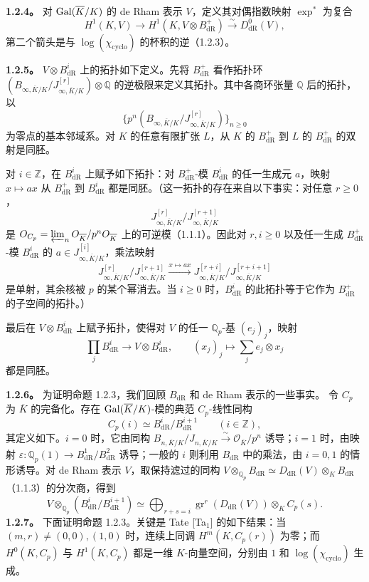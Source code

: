 \textbf{1.2.4。} 对 $\Gal(\overline K/K)$ 的 de Rham 表示 $V$，定义其对偶指数映射 $\exp^*$ 为复合
\[
 H^1(K,V)\longrightarrow H^1(K,V\otimes B^+_{\mathrm{dR}})\xrightarrow{\sim}D^0_{\mathrm{dR}}(V),
\]
第二个箭头是与 $\log(\chi_{\mathrm{cyclo}})$ 的杯积的逆（1.2.3）。

\textbf{1.2.5。} $V\otimes B^i_{\mathrm{dR}}$ 上的拓扑如下定义。先将 $B^+_{\mathrm{dR}}$ 看作拓扑环
$(B_{\infty,\overline K/K}/J^{[r]}_{\infty,\overline K/K})\otimes\mathbb Q$ 的逆极限来定义其拓扑。其中各商环张量 $\mathbb Q$ 后的拓扑，以
\[
 \{p^n(B_{\infty,\overline K/K}/J^{[r]}_{\infty,\overline K/K})\}_{n\ge0}
\]
为零点的基本邻域系。对 $K$ 的任意有限扩张 $L$，从 $K$ 的 $B^+_{\mathrm{dR}}$ 到 $L$ 的 $B^+_{\mathrm{dR}}$ 的双射是同胚。

对 $i\in\mathbb Z$，在 $B^i_{\mathrm{dR}}$ 上赋予如下拓扑：对 $B^+_{\mathrm{dR}}$-模 $B^i_{\mathrm{dR}}$ 的任一生成元 $a$，映射 $x\mapsto ax$ 从 $B^+_{\mathrm{dR}}$ 到 $B^i_{\mathrm{dR}}$ 都是同胚。（这一拓扑的存在来自以下事实：对任意 $r\ge0$，
\[
 J^{[r]}_{\infty,\overline K/K}/J^{[r+1]}_{\infty,\overline K/K}
\]
是 $\mathcal O_{C_p}=\varprojlim_n\mathcal O_{\overline K}/p^n\mathcal O_{\overline K}$ 上的可逆模（1.1.1）。因此对 $r,i\ge0$ 以及任一生成 $B^+_{\mathrm{dR}}$-模 $B^i_{\mathrm{dR}}$ 的 $a\in J^{[i]}_{\infty,\overline K/K}$，乘法映射
\[
 J^{[r]}_{\infty,\overline K/K}/J^{[r+1]}_{\infty,\overline K/K}
 \xrightarrow{x\mapsto ax}
 J^{[r+i]}_{\infty,\overline K/K}/J^{[r+i+1]}_{\infty,\overline K/K}
\]
是单射，其余核被 $p$ 的某个幂消去。当 $i\ge0$ 时，$B^i_{\mathrm{dR}}$ 的此拓扑等于它作为 $B^+_{\mathrm{dR}}$ 的子空间的拓扑。）

最后在 $V\otimes B^i_{\mathrm{dR}}$ 上赋予拓扑，使得对 $V$ 的任一 $\mathbb Q_p$-基 $(e_j)_j$，映射
\[
 \prod_j B^i_{\mathrm{dR}}\longrightarrow V\otimes B^i_{\mathrm{dR}},\qquad
 (x_j)_j\longmapsto\sum_j e_j\otimes x_j
\]
都是同胚。

\textbf{1.2.6。} 为证明命题 1.2.3，我们回顾 $B_{\mathrm{dR}}$ 和 de Rham 表示的一些事实。
令 $C_p$ 为 $\overline K$ 的完备化。存在 $\Gal(\overline K/K)$-模的典范 $C_p$-线性同构
\[
 C_p(i)\simeq B^i_{\mathrm{dR}}/B^{i+1}_{\mathrm{dR}}\qquad(i\in\mathbb Z),
\]
其定义如下。$i=0$ 时，它由同构 $B_{n,\overline K/K}/J_{n,\overline K/K}\xrightarrow{\sim}\mathcal O_{\overline K}/p^n$ 诱导；$i=1$ 时，由映射 $\varepsilon:\mathbb Q_p(1)\longrightarrow B^1_{\mathrm{dR}}/B^2_{\mathrm{dR}}$ 诱导；一般的 $i$ 则利用 $B_{\mathrm{dR}}$ 中的乘法，由 $i=0,1$ 的情形诱导。对 de Rham 表示 $V$，取保持滤过的同构
$V\otimes_{\mathbb Q_p}B_{\mathrm{dR}}\simeq D_{\mathrm{dR}}(V)\otimes_K B_{\mathrm{dR}}$（1.1.3）的分次商，得到
\begin{equation*}
 V\otimes_{\mathbb Q_p}(B^i_{\mathrm{dR}}/B^{i+1}_{\mathrm{dR}})
 \simeq\bigoplus_{r+s=i}\operatorname{gr}^r(D_{\mathrm{dR}}(V))\otimes_K C_p(s).\tag{1}
\end{equation*}
\textbf{1.2.7。} 下面证明命题 1.2.3。关键是 Tate [Ta$_1$] 的如下结果：当 $(m,r)\ne(0,0),(1,0)$ 时，连续上同调 $H^m(K,C_p(r))$ 为零；而 $H^0(K,C_p)$ 与 $H^1(K,C_p)$ 都是一维 $K$-向量空间，分别由 $1$ 和 $\log(\chi_{\mathrm{cyclo}})$ 生成。

